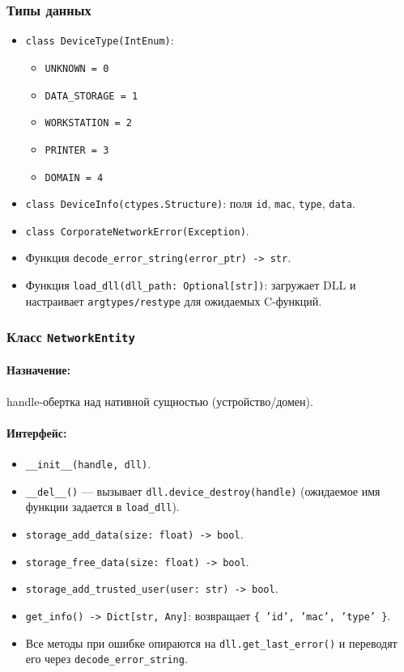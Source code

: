 \documentclass[14pt,a4paper]{extarticle}
\begin{document}
\subsubsection{Типы данных}
\begin{itemize}
  \item \texttt{class DeviceType(IntEnum)}:
  \begin{itemize}
    \item \texttt{UNKNOWN = 0}
    \item \texttt{DATA\_STORAGE = 1}
    \item \texttt{WORKSTATION = 2}
    \item \texttt{PRINTER = 3}
    \item \texttt{DOMAIN = 4}
  \end{itemize}
  \item \texttt{class DeviceInfo(ctypes.Structure)}:
  поля \texttt{id}, \texttt{mac}, \texttt{type}, \texttt{data}.
  \item \texttt{class CorporateNetworkError(Exception)}.
  \item Функция \texttt{decode\_error\_string(error\_ptr) -> str}.
  \item Функция \texttt{load\_dll(dll\_path: Optional[str])}:
  загружает DLL и настраивает \texttt{argtypes/restype} для ожидаемых C-функций.
 \end{itemize}

\subsubsection{Класс \texttt{NetworkEntity}}
\paragraph{Назначение:} handle-обертка над нативной сущностью (устройство/домен).
\paragraph{Интерфейс:}
\begin{itemize}
  \item \texttt{\_\_init\_\_(handle, dll)}.
  \item \texttt{\_\_del\_\_()} --- вызывает \texttt{dll.device\_destroy(handle)} (ожидаемое имя функции задается в \texttt{load\_dll}).
  \item \texttt{storage\_add\_data(size: float) -> bool}.
  \item \texttt{storage\_free\_data(size: float) -> bool}.
  \item \texttt{storage\_add\_trusted\_user(user: str) -> bool}.
  \item \texttt{get\_info() -> Dict[str, Any]}:
  возвращает \texttt{\{ 'id', 'mac', 'type' \}}.
  \item Все методы при ошибке опираются на \texttt{dll.get\_last\_error()} и переводят его через \texttt{decode\_error\_string}.
\end{itemize}
\end{document}
